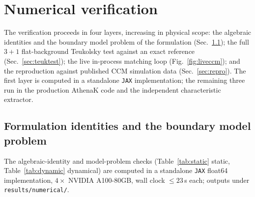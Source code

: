 \section{Numerical verification}
\label{sec:tests}

The verification proceeds in four layers, increasing in physical scope:
the algebraic identities and the boundary model problem of the
formulation (Sec.~\ref{sec:numerics}); the full $3+1$ flat-background
Teukolsky test against an exact reference (Sec.~\ref{sec:teuktest}); the
live in-process matching loop (Fig.~\ref{fig:liveccm}); and the
reproduction against published CCM simulation data
(Sec.~\ref{sec:repro}). The first layer is computed in a standalone
\texttt{JAX} implementation; the remaining three run in the production
AthenaK code \cite{Zhu:2024utz} and the independent characteristic
extractor.

\subsection{Formulation identities and the boundary model problem}
\label{sec:numerics}

The algebraic-identity and model-problem checks (Table~\ref{tab:static}
static, Table~\ref{tab:dynamic} dynamical) are computed in a standalone
\texttt{JAX} float64 implementation, $4\times$ NVIDIA A100-80GB, wall
clock $\le 23$\,s each; outputs under \texttt{results/numerical/}.

